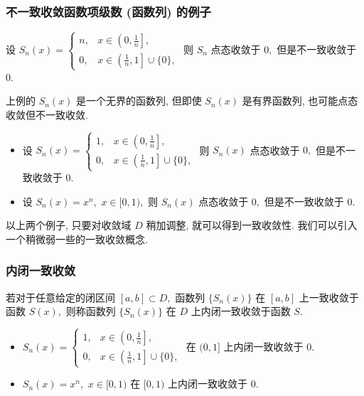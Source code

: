 \begin{frame}
\frametitle{不一致收敛函数项级数 (函数列) 的例子}

\begin{eg}
\begin{center}
设 $S_n(x) = \begin{cases} n, & x \in \left( 0, \frac{1}{n} \right], \\ 0, & x \in \left( \frac{1}{n}, 1 \right] \cup \{0\}, \end{cases}$ 则 $S_n$ 点态收敛于 $0,$ 但是不一致收敛于 $0.$
\end{center}
\end{eg}

\pause

上例的 $S_n(x)$ 是一个无界的函数列, 但即使 $S_n(x)$ 是有界函数列, 也可能点态收敛但不一致收敛.

\pause

\begin{eg}
\begin{itemize}
\item 设 $S_n(x) = \begin{cases} 1, & x \in \left( 0, \frac{1}{n} \right], \\ 0, & x \in \left( \frac{1}{n}, 1 \right] \cup \{0\}, \end{cases}$ 则 $S_n(x)$ 点态收敛于 $0,$ 但是不一致收敛于 $0.$
\pause
\item 设 $S_n(x) = x^n,$ $x \in [0, 1),$ 则 $S_n(x)$ 点态收敛于 $0,$ 但是不一致收敛于 $0.$
\end{itemize}
\end{eg}

\pause

以上两个例子, 只要对收敛域 $D$ 稍加调整, 就可以得到一致收敛性. 我们可以引入一个稍微弱一些的一致收敛概念.

\end{frame}


\begin{frame}
\frametitle{内闭一致收敛}

\begin{Def}[内闭一致收敛]
若对于任意给定的闭区间 $[a, b] \subset D,$ 函数列 $\{S_n(x)\}$ 在 $[a, b]$ 上一致收敛于函数 $S(x),$ 则称函数列 $\{S_n(x)\}$ 在 $D$ 上\alert{内闭一致收敛}于函数 $S.$
\end{Def}

\pause

\begin{eg}
\begin{itemize}
\item $S_n(x) = \begin{cases} 1, & x \in \left( 0, \frac{1}{n} \right], \\ 0, & x \in \left( \frac{1}{n}, 1 \right] \cup \{0\}, \end{cases}$ 在 $(0, 1]$ 上内闭一致收敛于 $0.$
\pause
\item $S_n(x) = x^n,$ $x \in [0, 1)$ 在 $[0, 1)$ 上内闭一致收敛于 $0.$
\end{itemize}
\end{eg}

\end{frame}

